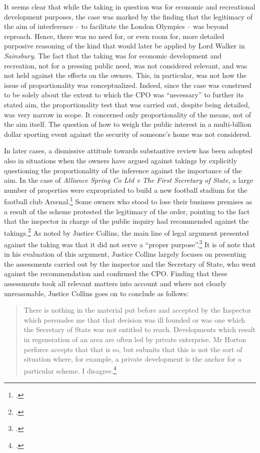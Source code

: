 \documentclass[12pt,a4paper]{book} %
\begin{document}
It seems clear that while the taking in question was for economic and recreational development purposes, the case was marked by the finding that the legitimacy of the aim of interference -- to facilitate the London Olympics -- was beyond reproach. Hence, there was no need for, or even room for, more detailed purposive reasoning of the kind that would later be applied by Lord Walker in {\it Sainsbury}. The fact that the taking was for economic development and recreation, not for a pressing public need, was not considered relevant, and was not held against the effects on the owners. This, in particular, was not how the issue of proportionality was conceptualized. Indeed, since the case was construed to be solely about the extent to which the CPO was ``necessary'' to further its stated aim, the proportionality test that was carried out, despite being detailed, was very narrow in scope. It concerned only proportionality of the means, not of the aim itself. The question of how to weigh the public interest in a multi-billion dollar sporting event against the security of someone's home was not considered.

In later cases, a dismissive attitude towards substantive review has been adopted also in situations when the owners have argued against takings by explicitly questioning the proportionality of the inference against the importance of the aim. In the case of {\it Alliance Spring Co Ltd v The First Secretary of State}, a large number of properties were expropriated to build a new football stadium for the football club Arsenal.\footcite{alliance06} Some owners who stood to lose their business premises as a result of the scheme protested the legitimacy of the order, pointing to the fact that the inspector in charge of the public inquiry had recommended against the takings.\footcite[6-7]{alliance06} As noted by Justice Collins, the main line of legal argument presented against the taking was that it did not serve a ``proper purpose''.\footcite[19]{alliance06} It is of note that in his evaluation of this argument, Justice Collins largely focuses on presenting the assessments carried out by the inspector and the Secretary of State, who went against the recommendation and confirmed the CPO. Finding that these assessments took all relevant matters into account and where not clearly unreasonable, Justice Collins goes on to conclude as follows: 

\begin{quote}
There is nothing in the material put before and accepted by the Inspector which persuades me that that decision was ill founded or was one which the Secretary of State was not entitled to reach. Developments which result in regeneration of an area are often led by private enterprise. Mr Horton perforce accepts that that is so, but submits that this is not the sort of situation where, for example, a private development is the anchor for a particular scheme. I disagree.\footcite[19]{alliance06}
\end{quote}
\end{document}
